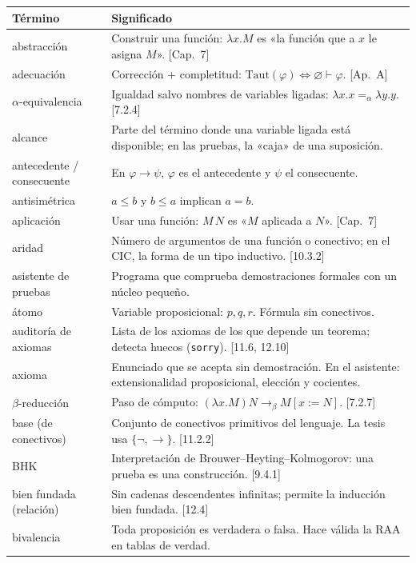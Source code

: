 \documentclass[11pt,a4paper]{article}
\newcommand{\bred}{\rightarrow_\beta}
\begin{document}
{\small
\begin{longtable}{@{}p{}p{}@{}}
\toprule
\textbf{Término} & \textbf{Significado}\\
\midrule
\endhead
abstracción & Construir una función: \(\lambda x.M\) es «la función que a \(x\) le asigna \(M\)». [Cap.\ 7]\\
adecuación & Corrección + completitud: \(\mathrm{Taut}(\varphi)\iff\varnothing\vdash\varphi\). [Ap.\ A]\\
\(\alpha\)-equivalencia & Igualdad salvo nombres de variables ligadas: \(\lambda x.x=_\alpha\lambda y.y\). [7.2.4]\\
alcance & Parte del término donde una variable ligada está disponible; en las pruebas, la «caja» de una suposición.\\
antecedente / consecuente & En \(\varphi\to\psi\), \(\varphi\) es el antecedente y \(\psi\) el consecuente.\\
antisimétrica & \(a\leq b\) y \(b\leq a\) implican \(a=b\).\\
aplicación & Usar una función: \(M\,N\) es «\(M\) aplicada a \(N\)». [Cap.\ 7]\\
aridad & Número de argumentos de una función o conectivo; en el CIC, la forma de un tipo inductivo. [10.3.2]\\
asistente de pruebas & Programa que comprueba demostraciones formales con un núcleo pequeño.\\
átomo & Variable proposicional: \(p,q,r\). Fórmula sin conectivos.\\
auditoría de axiomas & Lista de los axiomas de los que depende un teorema; detecta huecos (\texttt{sorry}). [11.6, 12.10]\\
axioma & Enunciado que se acepta sin demostración. En el asistente: extensionalidad proposicional, elección y cocientes.\\
\(\beta\)-reducción & Paso de cómputo: \((\lambda x.M)N\bred M[x:=N]\). [7.2.7]\\
base (de conectivos) & Conjunto de conectivos primitivos del lenguaje. La tesis usa \(\{\neg,\to\}\). [11.2.2]\\
BHK & Interpretación de Brouwer--Heyting--Kolmogorov: una prueba es una construcción. [9.4.1]\\
bien fundada (relación) & Sin cadenas descendentes infinitas; permite la inducción bien fundada. [12.4]\\
bivalencia & Toda proposición es verdadera o falsa. Hace válida la RAA en tablas de verdad.\\

\end{longtable}}
\end{document}
